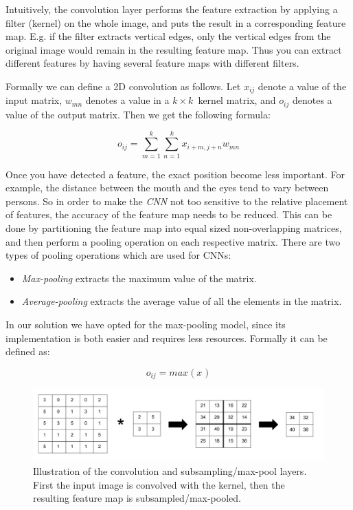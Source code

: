 Intuitively, the convolution layer performs the feature extraction by applying a filter (kernel) on the whole image, and puts the result in a corresponding feature map. E.g. if the filter extracts vertical edges, only the vertical edges from the original image would remain in the resulting feature map. Thus you can extract different features by having several feature maps with different filters.  

Formally we can define a 2D convolution as follows. Let $ x_{ij} $ denote a value of the input matrix, $ w_{mn} $ denotes a value in a $ k \times k $ kernel matrix, and $ o_{ij} $ denotes a value of the output matrix. Then we get the following formula:

\begin{equation*}
o_{ij} = \sum_{m=1}^{k}\sum_{n=1}^{k} x_{i+m, j+n}w_{mn}
\end{equation*}


Once you have detected a feature, the exact position become less important. For example, the distance between the mouth and the eyes tend to vary between persons. So in order to make the \textit{CNN} not too sensitive to the relative placement of features, the accuracy of the feature map needs to be reduced. This can be done by partitioning the feature map into equal sized non-overlapping matrices, and then perform a pooling operation on each respective matrix. There are two types of pooling operations which are used for CNNs: 

\begin{itemize}
	\item \textit{Max-pooling} extracts the maximum value of the matrix.
	\item \textit{Average-pooling} extracts the average value of all the elements in the matrix.
\end{itemize}

In our solution we have opted for the max-pooling model, since its implementation is both easier and requires less resources. Formally it can be defined as:

\begin{equation*}
o_{ij} = max(x_{})
\end{equation*}

\begin{figure}[h!]
  \centering
      \includegraphics[width=1.0\textwidth]{Figures/Background/Convolution-Maxpooling}
  \caption{Illustration of the convolution and subsampling/max-pool layers. First the input image is convolved with the kernel, then the resulting feature map is subsampled/max-pooled.}
\end{figure}








